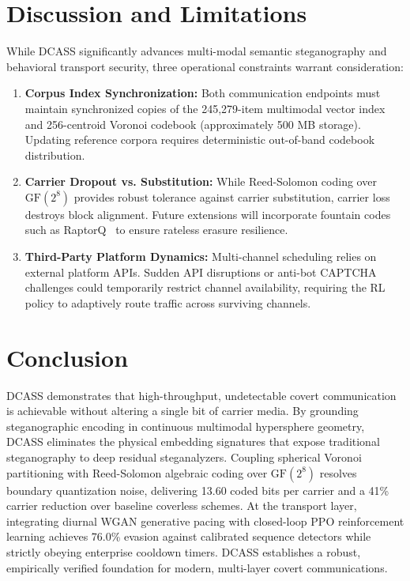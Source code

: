\documentclass[11pt,journal,onecolumn]{IEEEtran}\linespread{1.3}
\begin{document}
\section{Discussion and Limitations}

While DCASS significantly advances multi-modal semantic steganography and behavioral transport security, three operational constraints warrant consideration:
\begin{enumerate}
    \item \textbf{Corpus Index Synchronization:} Both communication endpoints must maintain synchronized copies of the 245,279-item multimodal vector index and 256-centroid Voronoi codebook (approximately 500 MB storage). Updating reference corpora requires deterministic out-of-band codebook distribution.
    \item \textbf{Carrier Dropout vs. Substitution:} While Reed-Solomon coding over $\text{GF}(2^8)$ provides robust tolerance against carrier substitution, carrier loss destroys block alignment. Future extensions will incorporate fountain codes such as RaptorQ~\cite{luby2002lt} to ensure rateless erasure resilience.
    \item \textbf{Third-Party Platform Dynamics:} Multi-channel scheduling relies on external platform APIs. Sudden API disruptions or anti-bot CAPTCHA challenges could temporarily restrict channel availability, requiring the RL policy to adaptively route traffic across surviving channels.
\end{enumerate}

\section{Conclusion}

DCASS demonstrates that high-throughput, undetectable covert communication is achievable without altering a single bit of carrier media. By grounding steganographic encoding in continuous multimodal hypersphere geometry, DCASS eliminates the physical embedding signatures that expose traditional steganography to deep residual steganalyzers. Coupling spherical Voronoi partitioning with Reed-Solomon algebraic coding over $\text{GF}(2^8)$ resolves boundary quantization noise, delivering 13.60 coded bits per carrier and a 41\% carrier reduction over baseline coverless schemes. At the transport layer, integrating diurnal WGAN generative pacing with closed-loop PPO reinforcement learning achieves 76.0\% evasion against calibrated sequence detectors while strictly obeying enterprise cooldown timers. DCASS establishes a robust, empirically verified foundation for modern, multi-layer covert communications.



\end{document}
